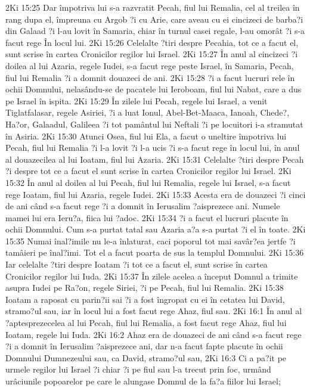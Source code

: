 2Ki 15:25  Dar împotriva lui s-a razvratit Pecah, fiul lui Remalia, cel al treilea în rang dupa el, împreuna cu Argob ?i cu Arie, care aveau cu ei cincizeci de barba?i din Galaad ?i l-au lovit în Samaria, chiar în turnul casei regale, l-au omorât ?i s-a facut rege În locul lui.
2Ki 15:26  Celelalte ?tiri despre Pecahia, tot ce a facut el, sunt scrise în cartea Cronicilor regilor lui Israel.
2Ki 15:27  În anul al cincizeci ?i doilea al lui Azaria, regele Iudei, s-a facut rege peste Israel, în Samaria, Pecah, fiul lui Remalia ?i a domnit douazeci de ani.
2Ki 15:28  ?i a facut lucruri rele în ochii Domnului, nelasându-se de pacatele lui Ieroboam, fiul lui Nabat, care a dus pe Israel în ispita.
2Ki 15:29  În zilele lui Pecah, regele lui Israel, a venit Tiglatfalasar, regele Asiriei, ?i a luat Ionul, Abel-Bet-Maaca, Ianoah, Chede?, Ha?or, Galaadul, Galileea ?i tot pamântul lui Neftali ?i pe locuitori i-a stramutat în Asiria.
2Ki 15:30  Atunci Osea, fiul lui Ela, a facut o uneltire împotriva lui Pecah, fiul lui Remalia ?i l-a lovit ?i l-a ucis ?i s-a facut rege în locul lui, în anul al douazecilea al lui Ioatam, fiul lui Azaria.
2Ki 15:31  Celelalte ?tiri despre Pecah ?i despre tot ce a facut el sunt scrise în cartea Cronicilor regilor lui Israel.
2Ki 15:32  În anul al doilea al lui Pecah, fiul lui Remalia, regele lui Israel, s-a facut rege Ioatam, fiul lui Azaria, regele Iudei.
2Ki 15:33  Acesta era de douazeci ?i cinci de ani când s-a facut rege ?i a domnit în Ierusalim ?aisprezece ani. Numele mamei lui era Ieru?a, fiica lui ?adoc.
2Ki 15:34  ?i a facut el lucruri placute în ochii Domnului. Cum s-a purtat tatal sau Azaria a?a s-a purtat ?i el în toate.
2Ki 15:35  Numai înal?imile nu le-a înlaturat, caci poporul tot mai savâr?ea jertfe ?i tamâieri pe înal?imi. Tot el a facut poarta de sus la templul Domnului.
2Ki 15:36  Iar celelalte ?tiri despre Ioatam ?i tot ce a facut el, sunt scrise în cartea Cronicilor regilor lui Iuda.
2Ki 15:37  În zilele acelea a început Domnul a trimite asupra Iudei pe Ra?on, regele Siriei, ?i pe Pecah, fiul lui Remalia.
2Ki 15:38  Ioatam a raposat cu parin?ii sai ?i a fost îngropat cu ei în cetatea lui David, stramo?ul sau, iar în locul lui a fost facut rege Ahaz, fiul sau.
2Ki 16:1  În anul al ?aptesprezecelea al lui Pecah, fiul lui Remalia, a fost facut rege Ahaz, fiul lui Ioatam, regele lui Iuda.
2Ki 16:2  Ahaz era de douazeci de ani când s-a facut rege ?i a domnit în Ierusalim ?aisprezece ani, dar n-a facut fapte placute în ochii Domnului Dumnezeului sau, ca David, stramo?ul sau,
2Ki 16:3  Ci a pa?it pe urmele regilor lui Israel ?i chiar ?i pe fiul sau l-a trecut prin foc, urmând urâciunile popoarelor pe care le alungase Domnul de la fa?a fiilor lui Israel;
